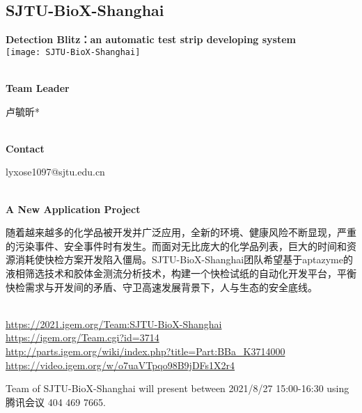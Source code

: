 \subsection{\textcolor{Blu}{ SJTU-BioX-Shanghai } }
\vspace{5mm}
\begin{center}
\large{
  \textbf{ Detection Blitz：an automatic test strip developing system }\\

  \texttt{[image: SJTU-BioX-Shanghai]}
}
\end{center}
\textbf{\\Team Leader}

  卢毓昕*


\textbf{\\Contact}

  lyxose1097@sjtu.edu.cn


\textbf{\\A New Application Project\\}\begin{spacing}{1.5}

随着越来越多的化学品被开发并广泛应用，全新的环境、健康风险不断显现，严重的污染事件、安全事件时有发生。而面对无比庞大的化学品列表，巨大的时间和资源消耗使快检方案开发陷入僵局。SJTU-BioX-Shanghai团队希望基于aptazyme的液相筛选技术和胶体金测流分析技术，构建一个快检试纸的自动化开发平台，平衡快检需求与开发间的矛盾、守卫高速发展背景下，人与生态的安全底线。\end{spacing}
\\

\url{https://2021.igem.org/Team:SJTU-BioX-Shanghai }\\
\url{https://igem.org/Team.cgi?id=3714 }\\
\url{http://parts.igem.org/wiki/index.php?title=Part:BBa_K3714000 }\\
\url{https://video.igem.org/w/o7uaVTpqo98B9jDFs1X2r4 }\\

\vfill{}









Team of SJTU-BioX-Shanghai will present between  2021/8/27 15:00-16:30       using 腾讯会议 404 469 7665.
\newpage

